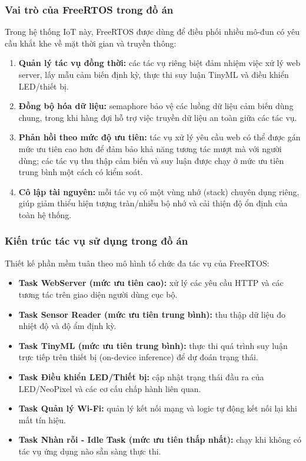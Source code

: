 \subsubsection{Vai trò của FreeRTOS trong đồ án}
Trong hệ thống IoT này, FreeRTOS được dùng để điều phối nhiều mô-đun có yêu cầu khắt khe về mặt thời gian và truyền thông:
\begin{enumerate}
	\item \textbf{Quản lý tác vụ đồng thời:} các tác vụ riêng biệt đảm nhiệm việc xử lý web server, lấy mẫu cảm biến định kỳ, thực thi suy luận TinyML và điều khiển LED/thiết bị.
	\item \textbf{Đồng bộ hóa dữ liệu:} semaphore bảo vệ các luồng dữ liệu cảm biến dùng chung, trong khi hàng đợi hỗ trợ việc truyền dữ liệu an toàn giữa các tác vụ.
	\item \textbf{Phản hồi theo mức độ ưu tiên:} tác vụ xử lý yêu cầu web có thể được gán mức ưu tiên cao hơn để đảm bảo khả năng tương tác mượt mà với người dùng; các tác vụ thu thập cảm biến và suy luận được chạy ở mức ưu tiên trung bình một cách có kiểm soát.
	\item \textbf{Cô lập tài nguyên:} mỗi tác vụ có một vùng nhớ (stack) chuyên dụng riêng, giúp giảm thiểu hiện tượng tràn/nhiễu bộ nhớ và cải thiện độ ổn định của toàn hệ thống.
\end{enumerate}

\subsubsection{Kiến trúc tác vụ sử dụng trong đồ án}
Thiết kế phần mềm tuân theo mô hình tổ chức đa tác vụ của FreeRTOS:
\begin{itemize}
	\item \textbf{Task WebServer (mức ưu tiên cao):} xử lý các yêu cầu HTTP và các tương tác trên giao diện người dùng cục bộ.
	\item \textbf{Task Sensor Reader (mức ưu tiên trung bình):} thu thập dữ liệu đo nhiệt độ và độ ẩm định kỳ.
	\item \textbf{Task TinyML (mức ưu tiên trung bình):} thực thi quá trình suy luận trực tiếp trên thiết bị (on-device inference) để dự đoán trạng thái.
	\item \textbf{Task Điều khiển LED/Thiết bị:} cập nhật trạng thái đầu ra của LED/NeoPixel và các cơ cấu chấp hành liên quan.
	\item \textbf{Task Quản lý Wi-Fi:} quản lý kết nối mạng và logic tự động kết nối lại khi mất tín hiệu.
	\item \textbf{Task Nhàn rỗi - Idle Task (mức ưu tiên thấp nhất):} chạy khi không có tác vụ ứng dụng nào sẵn sàng thực thi.
\end{itemize}



